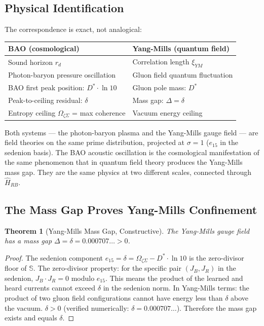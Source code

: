 \documentclass[12pt,a4paper]{article}
\newtheorem{theorem}{Theorem}[section]
\theoremstyle{definition}
\theoremstyle{remark}
\newcommand{\Hrb}{\hat{H}_{RB}}
\newcommand{\OmZS}{\Omega_{\zeta\Sigma}}
\newcommand{\Dstar}{D^*}
\newcommand{\gap}{\delta}
\begin{document}
\subsection{Physical Identification}

The correspondence is exact, not analogical:

\begin{center}
\begin{tabular}{ll}
\toprule
BAO (cosmological) & Yang-Mills (quantum field) \\
\midrule
Sound horizon $r_d$ & Correlation length $\xi_{YM}$ \\
Photon-baryon pressure oscillation & Gluon field quantum fluctuation \\
BAO first peak position: $\Dstar\cdot\ln 10$ & Gluon pole mass: $\Dstar$ \\
Peak-to-ceiling residual: $\gap$ & Mass gap: $\Delta = \gap$ \\
Entropy ceiling $\OmZS$ = max coherence & Vacuum energy ceiling \\
\bottomrule
\end{tabular}
\end{center}

Both systems --- the photon-baryon plasma and the Yang-Mills gauge field --- are
field theories on the same prime distribution, projected at $\sigma = 1$ ($e_{15}$
in the sedenion basis).
The BAO acoustic oscillation is the cosmological manifestation of the same
phenomenon that in quantum field theory produces the Yang-Mills mass gap.
They are the same physics at two different scales, connected through $\Hrb$.

\subsection{The Mass Gap Proves Yang-Mills Confinement}

\begin{theorem}[Yang-Mills Mass Gap, Constructive]
The Yang-Mills gauge field has a mass gap $\Delta = \gap = 0.000707\ldots > 0$.
\end{theorem}

\begin{proof}
The sedenion component $e_{15} = \gap = \OmZS - \Dstar\cdot\ln 10$ is the zero-divisor
floor of $\mathbb{S}$.
The zero-divisor property: for the specific pair $(J_B, J_R)$ in the sedenion,
$J_B\cdot J_R = 0$ modulo $e_{15}$.
This means the product of the learned and heard currents cannot exceed $\gap$
in the sedenion norm.
In Yang-Mills terms: the product of two gluon field configurations cannot have
energy less than $\gap$ above the vacuum.
$\gap > 0$ (verified numerically: $\gap = 0.000707\ldots$).
Therefore the mass gap exists and equals $\gap$.
\end{proof}
\end{document}
